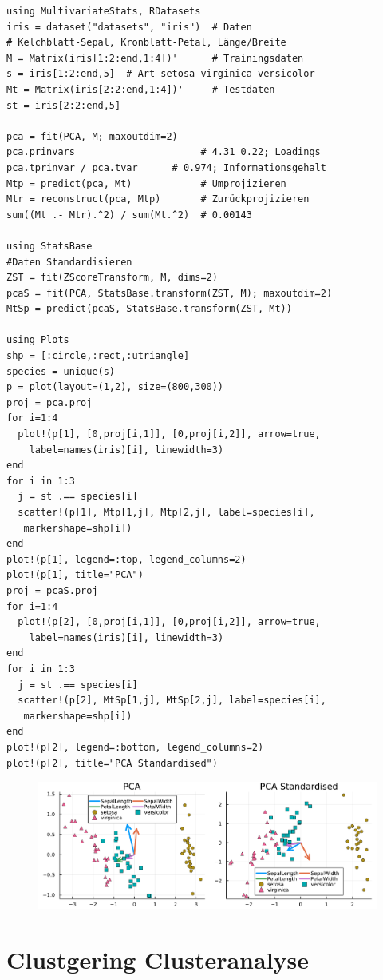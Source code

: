 \documentclass[10pt,twocolumn]{scrartcl}
\begin{document}
\begin{lstlisting}
using MultivariateStats, RDatasets
iris = dataset("datasets", "iris")  # Daten
# Kelchblatt-Sepal, Kronblatt-Petal, Länge/Breite
M = Matrix(iris[1:2:end,1:4])'      # Trainingsdaten
s = iris[1:2:end,5]  # Art setosa virginica versicolor
Mt = Matrix(iris[2:2:end,1:4])'     # Testdaten
st = iris[2:2:end,5]

pca = fit(PCA, M; maxoutdim=2)
pca.prinvars                      # 4.31 0.22; Loadings
pca.tprinvar / pca.tvar      # 0.974; Informationsgehalt
Mtp = predict(pca, Mt)            # Umprojizieren
Mtr = reconstruct(pca, Mtp)       # Zurückprojizieren
sum((Mt .- Mtr).^2) / sum(Mt.^2)  # 0.00143

using StatsBase
#Daten Standardisieren
ZST = fit(ZScoreTransform, M, dims=2)
pcaS = fit(PCA, StatsBase.transform(ZST, M); maxoutdim=2)
MtSp = predict(pcaS, StatsBase.transform(ZST, Mt))

using Plots
shp = [:circle,:rect,:utriangle]
species = unique(s)
p = plot(layout=(1,2), size=(800,300))
proj = pca.proj
for i=1:4
  plot!(p[1], [0,proj[i,1]], [0,proj[i,2]], arrow=true,
    label=names(iris)[i], linewidth=3)
end
for i in 1:3
  j = st .== species[i]
  scatter!(p[1], Mtp[1,j], Mtp[2,j], label=species[i],
   markershape=shp[i])
end
plot!(p[1], legend=:top, legend_columns=2)
plot!(p[1], title="PCA")
proj = pcaS.proj
for i=1:4
  plot!(p[2], [0,proj[i,1]], [0,proj[i,2]], arrow=true,
    label=names(iris)[i], linewidth=3)
end
for i in 1:3
  j = st .== species[i]
  scatter!(p[2], MtSp[1,j], MtSp[2,j], label=species[i],
   markershape=shp[i])
end
plot!(p[2], legend=:bottom, legend_columns=2)
plot!(p[2], title="PCA Standardised")
\end{lstlisting}

\begin{figure}[ht]
  \centering
  \includegraphics[width=.95\columnwidth]{pca.pdf}
\end{figure}

\section{Clustgering Clusteranalyse}
\end{document}
